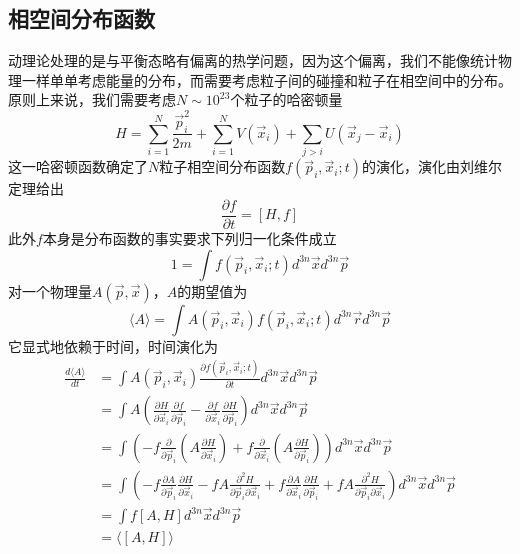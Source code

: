 \documentclass[a4paper,11pt]{ctexart}
\newcommand{\beq}{\begin{equation}}
\newcommand{\eeq}{\end{equation}}
\newcommand{\bea}{\begin{equation}\begin{aligned}}
\newcommand{\eea}{\end{aligned}\end{equation}}
\newcommand{\pfrac}[2]{\frac{\partial #1}{\partial #2}}
\begin{document}
\subsection{相空间分布函数}
动理论处理的是与平衡态略有偏离的热学问题，因为这个偏离，我们不能像统计物理一样单单考虑能量的分布，而需要考虑粒子间的碰撞和粒子在相空间中的分布。原则上来说，我们需要考虑$N\sim 10^{23}$个粒子的哈密顿量
\beq
H = \sum_{i=1}^{N} \frac{\vec{p}_i^2}{2m} + \sum_{i=1}^{N} V(\vec{x}_i) + \sum_{j>i} U(\vec{x}_j - \vec{x}_i)
\eeq
这一哈密顿函数确定了$N$粒子相空间分布函数$f(\vec{p}_i,\vec{x}_i;t)$的演化，演化由刘维尔定理给出
\beq
\pfrac{f}{t} = [H,f]
\eeq
此外$f$本身是分布函数的事实要求下列归一化条件成立
\beq
1 = \int f(\vec{p}_i,\vec{x}_i;t) d^{3n} \vec{x} d^{3n} \vec{p}
\eeq
对一个物理量$A(\vec{p},\vec{x})$，$A$的期望值为
\beq
\langle A \rangle = \int  A(\vec{p}_i,\vec{x}_i) f(\vec{p}_i,\vec{x}_i;t) d^{3n} \vec{r} d^{3n} \vec{p}
\eeq
它显式地依赖于时间，时间演化为
\bea
\frac{d\langle A \rangle}{dt} &=  \int  A(\vec{p}_i,\vec{x}_i) \pfrac{f(\vec{p}_i,\vec{x}_i;t)}{t} d^{3n} \vec{x} d^{3n} \vec{p} \\
&= \int A (\pfrac{H}{\vec{x}_i} \pfrac{f}{\vec{p}_i} - \pfrac{f}{\vec{x}_i} \pfrac{H}{\vec{p}_i}) d^{3n} \vec{x} d^{3n} \vec{p} \\
&= \int (- f \pfrac{}{\vec{p}_i}(A \pfrac{H}{\vec{x}_i}) + f \pfrac{}{\vec{x}_i}(A \pfrac{H}{\vec{p}_i}))  d^{3n} \vec{x} d^{3n} \vec{p} \\
&= \int (- f \pfrac{A}{\vec{p}_i}\pfrac{H}{\vec{x}_i} - fA \frac{\partial^2 H}{\partial \vec{p}_i \partial \vec{x}_i} + f \pfrac{A}{\vec{x}_i}\pfrac{H}{\vec{p}_i} + fA \frac{\partial^2 H}{\partial \vec{p}_i \partial \vec{x}_i})  d^{3n} \vec{x} d^{3n} \vec{p} \\
&= \int f [A,H]  d^{3n} \vec{x} d^{3n} \vec{p} \\
&= \langle [A,H] \rangle
\eea
\end{document}

